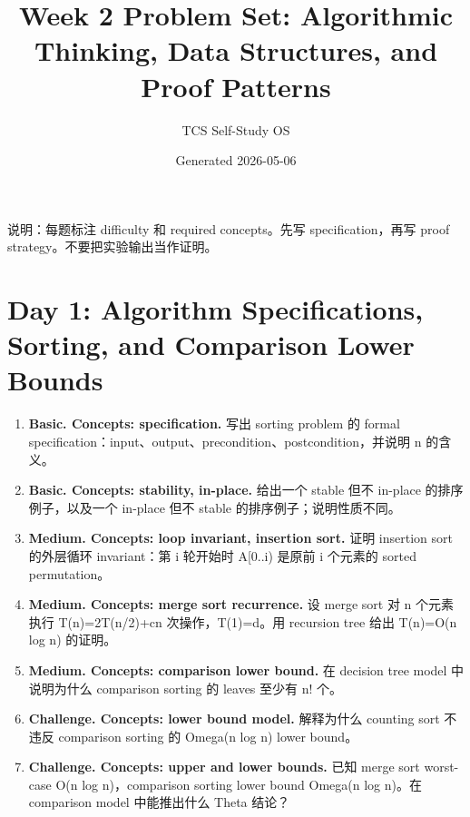 \documentclass[11pt]{ctexart}
\title{Week 2 Problem Set: Algorithmic Thinking, Data Structures, and Proof Patterns}
\author{TCS Self-Study OS}
\date{Generated 2026-05-06}
\begin{document}
\maketitle

说明：每题标注 difficulty 和 required concepts。先写 specification，再写 proof strategy。不要把实验输出当作证明。

\section{Day 1: Algorithm Specifications, Sorting, and Comparison Lower Bounds}
\begin{enumerate}
  \item \textbf{Basic. Concepts: specification.} 写出 sorting problem 的 formal specification：input、output、precondition、postcondition，并说明 n 的含义。
  \item \textbf{Basic. Concepts: stability, in-place.} 给出一个 stable 但不 in-place 的排序例子，以及一个 in-place 但不 stable 的排序例子；说明性质不同。
  \item \textbf{Medium. Concepts: loop invariant, insertion sort.} 证明 insertion sort 的外层循环 invariant：第 i 轮开始时 A[0..i) 是原前 i 个元素的 sorted permutation。
  \item \textbf{Medium. Concepts: merge sort recurrence.} 设 merge sort 对 n 个元素执行 T(n)=2T(n/2)+cn 次操作，T(1)=d。用 recursion tree 给出 T(n)=O(n log n) 的证明。
  \item \textbf{Medium. Concepts: comparison lower bound.} 在 decision tree model 中说明为什么 comparison sorting 的 leaves 至少有 n! 个。
  \item \textbf{Challenge. Concepts: lower bound model.} 解释为什么 counting sort 不违反 comparison sorting 的 Omega(n log n) lower bound。
  \item \textbf{Challenge. Concepts: upper and lower bounds.} 已知 merge sort worst-case O(n log n)，comparison sorting lower bound Omega(n log n)。在 comparison model 中能推出什么 Theta 结论？
\end{enumerate}
\end{document}
